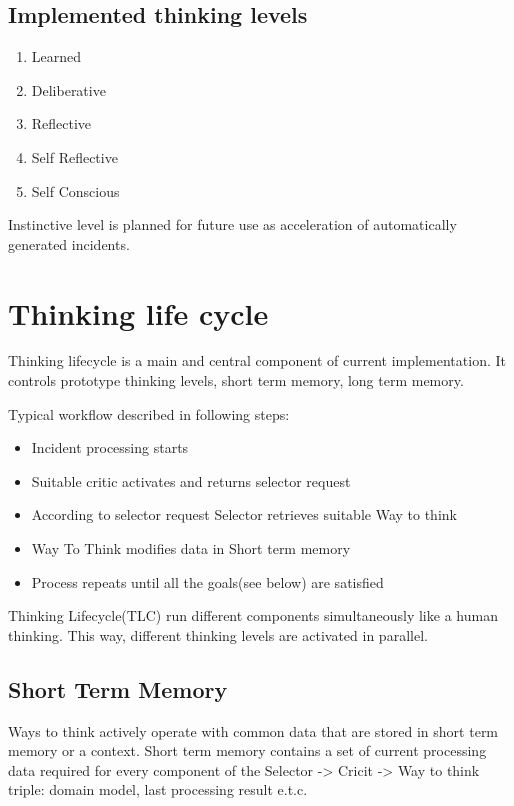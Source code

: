 \documentclass[runningheads,a4paper]{llncs}
\begin{document}
\subsection{Implemented thinking levels}

\begin{enumerate}
 \item Learned
 \item Deliberative
 \item Reflective
 \item Self Reflective
 \item Self Conscious
\end{enumerate}

Instinctive level is planned for future use as acceleration of automatically generated incidents.

\section{Thinking life cycle}

Thinking lifecycle is a main and central component of current implementation. It controls prototype thinking levels, short term memory, long term memory.

Typical workflow described in following steps:

\begin{itemize}
 \item Incident processing starts
 \item Suitable critic activates and returns selector request
 \item According to selector request Selector retrieves suitable Way to think
 \item Way To Think modifies data in Short term memory
 \item Process repeats until all the goals(see below) are satisfied
\end{itemize}

Thinking Lifecycle(TLC) run different components simultaneously like a human thinking. This way, different thinking levels are activated in parallel.

\subsection{Short Term Memory}
Ways to think actively operate with common data that are stored in short term memory or a context. Short term memory contains a set of current processing data required for every component of the Selector -> Cricit -> Way to think triple: domain model, last processing result e.t.c.
\end{document}
